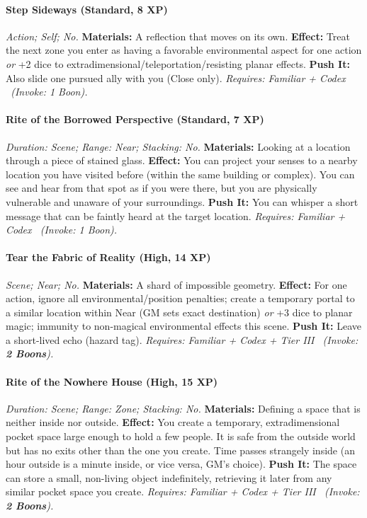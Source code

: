 \documentclass[12pt,twoside]{book}
\begin{document}
\paragraph{Step Sideways (Standard, 8 XP)} \emph{Action; Self; No.}
\textbf{Materials:} A reflection that moves on its own.
\textbf{Effect:} Treat the next zone you enter as having a favorable environmental aspect for one action \emph{or} +2 dice to extradimensional/teleportation/resisting planar effects.
\textbf{Push It:} Also slide one pursued ally with you (Close only).
\emph{Requires: Familiar + Codex \ (\textit{Invoke:} 1 Boon).}
\paragraph{Rite of the Borrowed Perspective (Standard, 7 XP)} \emph{Duration: Scene; Range: Near; Stacking: No.}
\textbf{Materials:} Looking at a location through a piece of stained glass.
\textbf{Effect:} You can project your senses to a nearby location you have visited before (within the same building or complex). You can see and hear from that spot as if you were there, but you are physically vulnerable and unaware of your surroundings.
\textbf{Push It:} You can whisper a short message that can be faintly heard at the target location.
\emph{Requires: Familiar + Codex \ (\textit{Invoke:} 1 Boon).}
\paragraph{Tear the Fabric of Reality (High, 14 XP)} \emph{Scene; Near; No.}
\textbf{Materials:} A shard of impossible geometry.
\textbf{Effect:} For one action, ignore all environmental/position penalties; create a temporary portal to a similar location within Near (GM sets exact destination) \emph{or} +3 dice to planar magic; immunity to non-magical environmental effects this scene.
\textbf{Push It:} Leave a short-lived echo (hazard tag).
\emph{Requires: Familiar + Codex + Tier III \ (\textit{Invoke:} \textbf{2 Boons}).}
\paragraph{Rite of the Nowhere House (High, 15 XP)} \emph{Duration: Scene; Range: Zone; Stacking: No.}
\textbf{Materials:} Defining a space that is neither inside nor outside.
\textbf{Effect:} You create a temporary, extradimensional pocket space large enough to hold a few people. It is safe from the outside world but has no exits other than the one you create. Time passes strangely inside (an hour outside is a minute inside, or vice versa, GM's choice).
\textbf{Push It:} The space can store a small, non-living object indefinitely, retrieving it later from any similar pocket space you create.
\emph{Requires: Familiar + Codex + Tier III \ (\textit{Invoke:} \textbf{2 Boons}).}
\end{document}
